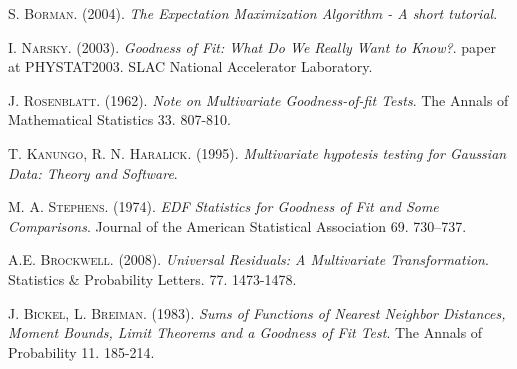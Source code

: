 \documentclass[a4paper,journal]{IEEEtran}
\begin{document}
\begin{thebibliography}{1}

  \textsc{S. Borman}. (2004). \emph{The Expectation Maximization Algorithm - A short tutorial}.
  
  \textsc{I. Narsky}. (2003). \emph{Goodness of Fit: What Do We Really Want to Know?}. 
  paper at PHYSTAT2003. SLAC National Accelerator Laboratory. 

  \textsc{J. Rosenblatt}. (1962). \emph{Note on Multivariate Goodness-of-fit Tests}. 
  The Annals of Mathematical Statistics 33. 807-810.

  \textsc{T. Kanungo, R. N. Haralick}. (1995). 
  \emph{Multivariate hypotesis testing for Gaussian Data: Theory and Software}.

  \textsc{M. A. Stephens}. (1974). 
  \emph{EDF Statistics for Goodness of Fit and Some Comparisons}.
  Journal of the American Statistical Association 69. 730–737.

  \textsc{A.E. Brockwell}. (2008). 
  \emph{Universal Residuals: A Multivariate Transformation}.
  Statistics \& Probability Letters. 77. 1473-1478.

   \textsc{J. Bickel, L. Breiman}. (1983). 
   \emph{Sums of Functions of Nearest Neighbor Distances, Moment Bounds, Limit Theorems and a Goodness of Fit Test}.
   The Annals of Probability 11. 185-214. 


\end{thebibliography}

\end{document}
